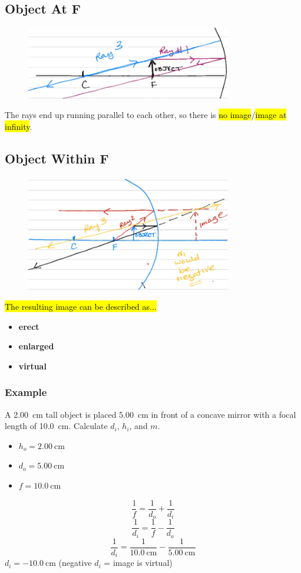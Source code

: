 \documentclass[a4paper,12pt]{article}
\begin{document}
\subsection{Object At F}
\begin{figure}[H]
    \centering
    \includegraphics[width=0.8\textwidth]{concave-mirror-atF}
\end{figure}

The rays end up running parallel to each other, so there is \hl{no image}/\hl{image at infinity}.

\subsection{Object Within F}
\begin{figure}[H]
    \centering
    \includegraphics[width=0.8\textwidth]{concave-mirror-withinF}
\end{figure}
\hl{The resulting image can be described as...}
\begin{itemize}
    \item{\textbf{erect}}
    \item{\textbf{enlarged}}
    \item{\textbf{virtual}}
\end{itemize}

\subsubsection{Example}
A \SI{2.00}{\cm} tall object is placed \SI{5.00}{\cm} in front of a concave mirror with a focal length of \SI{10.0}{\cm}. Calculate $d_i$, $h_i$, and $m$.
\begin{itemize}
    \item{$h_o = \SI{2.00}{\cm}$}
    \item{$d_o = \SI{5.00}{\cm}$}
    \item{$f = \SI{10.0}{\cm}$}
\end{itemize}
$$\frac{1}{f} = \frac{1}{d_o} + \frac{1}{d_i}$$
$$\frac{1}{d_i} = \frac{1}{f} - \frac{1}{d_o}$$
$$\frac{1}{d_i} = \frac{1}{\SI{10.0}{\cm}} - \frac{1}{\SI{5.00}{\cm}}$$
$d_i = \SI{-10.0}{\cm}$ (negative $d_i$ = image is virtual)
\end{document}
